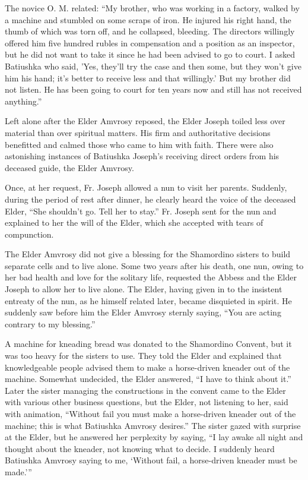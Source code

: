 The novice O. M. related: ``My brother, who was working in a factory, walked by a machine and stumbled on some scraps of iron. He injured his right hand, the thumb of which was torn off, and he collapsed, bleeding. The directors willingly offered him five hundred rubles in compensation and a position as an inspector, but he did not want to take it since he had been advised to go to court. I asked Batiushka who said, 'Yes, they'll try the case and then some, but they won't give him his hand; it's better to receive less and that willingly.' But my brother did not listen. He has been going to court for ten years now and still has not received anything.''

Left alone after the Elder Amvrosy reposed, the Elder Joseph toiled less over material than over spiritual matters. His firm and authoritative decisions benefitted and calmed those who came to him with faith. There were also astonishing instances of Batiushka Joseph's receiving direct orders from his deceased guide, the Elder Amvrosy.

Once, at her request, Fr. Joseph allowed a nun to visit her parents. Suddenly, during the period of rest after dinner, he clearly heard the voice of the deceased Elder, ``She shouldn't go. Tell her to stay.'' Fr. Joseph sent for the nun and explained to her the will of the Elder, which she accepted with tears of compunction.

The Elder Amvrosy did not give a blessing for the Shamordino sisters to build separate cells and to live alone. Some two years after his death, one nun, owing to her bad health and love for the solitary life, requested the Abbess and the Elder Joseph to allow her to live alone. The Elder, having given in to the insistent entreaty of the nun, as he himself related later, became disquieted in spirit. He suddenly saw before him the Elder Amvrosy sternly saying, ``You are acting contrary to my blessing.''

A machine for kneading bread was donated to the Shamordino Convent, but it was too heavy for the sisters to use. They told the Elder and explained that knowledgeable people advised them to make a horse-driven kneader out of the machine. Somewhat undecided, the Elder answered, ``I have to think about it.'' Later the sister managing the constructions in the convent came to the Elder with various other business questions, but the Elder, not listening to her, said with animation, ``Without fail you must make a horse-driven kneader out of the machine; this is what Batiushka Amvrosy desires.'' The sister gazed with surprise at the Elder, but he answered her perplexity by saying, ``I lay awake all night and thought about the kneader, not knowing what to decide. I suddenly heard Batiushka Amvrosy saying to me, `Without fail, a horse-driven kneader must be made.'''

